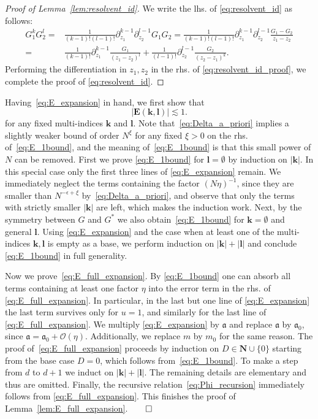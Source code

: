 \documentclass[10pt]{amsart}
\numberwithin{equation}{section}
\newcommand{\E}{\mathbf{E}}
\newcommand{\N}{\mathbf{N}}
\newcommand{\ma}{\mathfrak{a}}
\begin{document}
\begin{proof}[Proof of Lemma~\ref{lem:resolvent_id}] We write the lhs. of \eqref{eq:resolvent_id} as follows:
\begin{equation}
\begin{split}
G_1^kG_2^l =& \frac{1}{(k-1)!(l-1)!} \partial_{z_1}^{k-1}\partial_{z_2}^{l-1} G_1G_2 = \frac{1}{(k-1)!(l-1)!} \partial_{z_1}^{k-1}\partial_{z_2}^{l-1} \frac{G_1-G_2}{z_1-z_2}\\
=& \frac{1}{(k-1)!} \partial_{z_1}^{k-1} \frac{G_1}{(z_1-z_2)^l} + \frac{1}{(l-1)!} \partial_{z_2}^{l-1} \frac{G_2}{(z_2-z_1)^k}.
\end{split}
\label{eq:resolvent_id_proof}
\end{equation}
Performing the differentiation in $z_1,z_2$ in the rhs. of \eqref{eq:resolvent_id_proof}, we complete the proof of \eqref{eq:resolvent_id}.
\end{proof}

Having~\eqref{eq:E_expansion} in hand, we first show that
\begin{equation}
\left\vert \E(\bm{k},\bm{l})\right\vert\lesssim 1.
\label{eq:E_1bound}
\end{equation}
for any fixed multi-indices $\bm{k}$ and $\bm{l}$. Note that~\eqref{eq:Delta_a_priori} implies a slightly weaker bound of order $N^\xi$ for any fixed $\xi>0$ on the rhs. of~\eqref{eq:E_1bound}, and the meaning of~\eqref{eq:E_1bound} is that this small power of $N$ can be removed. First we prove \eqref{eq:E_1bound} for $\bm{l}=\emptyset$ by induction on $|\bm{k}|$. In this special case only the first three lines of \eqref{eq:E_expansion} remain. We immediately neglect the terms containing the factor $(N\eta)^{-1}$, since they are smaller than $N^{-\epsilon +\xi}$ by~\eqref{eq:Delta_a_priori}, and observe that only the terms with strictly smaller $|\bm{k}|$ are left, which makes the induction work. Next, by the symmetry between $G$ and $G^*$ we also obtain~\eqref{eq:E_1bound} for $\bm{k}=\emptyset$ and general $\bm{l}$. Using \eqref{eq:E_expansion} and the case when at least one of the multi-indices $\bm{k}, \bm{l}$ is empty as a base, we perform induction on $|\bm{k}|+|\bm{l}|$ and conclude \eqref{eq:E_1bound} in full generality.

Now we prove~\eqref{eq:E_full_expansion}. By \eqref{eq:E_1bound} one can absorb all terms containing at least one factor $\eta$ into the error term in the rhs. of \eqref{eq:E_full_expansion}. In particular, in the last but one line of \eqref{eq:E_expansion} the last term survives only for $u=1$, and similarly for the last line of \eqref{eq:E_full_expansion}. We multiply \eqref{eq:E_expansion} by $\ma$ and replace $\ma$ by $\ma_0$, since $\ma=\ma_0+\mathcal{O}(\eta)$. Additionally, we replace $m$ by $m_0$ for the same reason. The proof of~\eqref{eq:E_full_expansion} proceeds by induction on $D\in \N\cup\{0\}$ starting from the base case $D=0$, which follows from~\eqref{eq:E_1bound}. To make a step from $d$ to $d+1$ we induct on $|\bm{k}|+|\bm{l}|$. The remaining details are elementary and thus are omitted. Finally, the recursive relation~\eqref{eq:Phi_recursion} immediately follows from \eqref{eq:E_full_expansion}. This finishes the proof of Lemma~\ref{lem:E_full_expansion}.\hfill$\qed$
\end{document}

